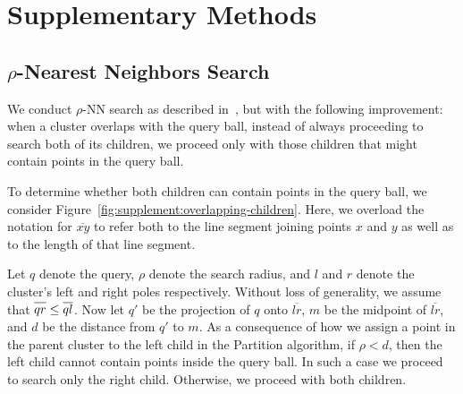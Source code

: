 \documentclass[review,supplement,onefignum,onetabnum]{siamonline220329}
\begin{document}
\ifpdf
{}
\fi


\maketitle


\section{Supplementary Methods}

\subsection{\texorpdfstring{$\rho$}{p}-Nearest Neighbors Search}

We conduct $\rho$-NN search as described in~\cite{ishaq2019clustered}, but with the following improvement:
when a cluster overlaps with the query ball, instead of always proceeding to search both of its children, we proceed only with those children that might contain points in the query ball.

To determine whether both children can contain points in the query ball, we consider Figure~\ref{fig:supplement:overlapping-children}.
Here, we overload the notation for $\overline{x y}$ to refer both to the line segment joining points $x$ and $y$ as well as to the length of that line segment.

Let $q$ denote the query, $\rho$ denote the search radius, and $l$ and $r$ denote the cluster's left and right poles respectively.
Without loss of generality, we assume that $\overline{q r \vphantom{l}} \leq \overline{q l}$.
Now let $q'$ be the projection of $q$ onto $\overline{l r}$, $m$ be the midpoint of $\overline{l r}$, and $d$ be the distance from $q'$ to $m$.
As a consequence of how we assign a point in the parent cluster to the left child in the Partition algorithm, if $\rho < d$, then the left child cannot contain points inside the query ball.
In such a case we proceed to search only the right child.
Otherwise, we proceed with both children.
\end{document}
